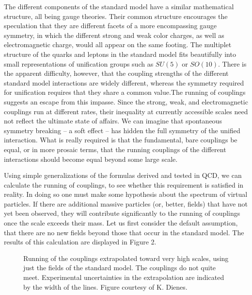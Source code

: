 \documentclass[aps,epsf]{revtex4}
\begin{document}
The different components of
the standard model have a similar mathematical structure, all being
gauge theories.  Their common structure encourages the speculation
that they are different facets of a more encompassing gauge symmetry,
in which the different strong and weak color charges, as well as
electromagnetic charge, would all appear on the same footing.  The
multiplet structure of the quarks and leptons in the standard model
fits beautifully into small representations of unification groups such
as $SU(5)$ or $SO(10)$.  There is the apparent difficulty, however,
that the coupling strengths of the different standard model
interactions are widely different, whereas the symmetry required for
unification requires that they share a common value.The running of
couplings suggests an escape from this impasse.  Since the strong,
weak, and electromagnetic couplings run at different rates, their
inequality at currently accessible scales need not reflect the
ultimate state of affairs.  We can imagine that spontaneous symmetry
breaking -- a soft effect -- has hidden the full symmetry of the
unified interaction.  What is really required is that the fundamental,
bare couplings be equal, or in more prosaic terms, that the running
couplings of the different interactions should become equal beyond
some large scale.  

Using simple generalizations of the formulas
derived and tested in QCD, we can calculate the running of couplings,
to see whether this requirement is satisfied in reality.  
In doing so one must make
some hypothesis about the spectrum of virtual particles.  If there are
additional massive particles (or, better, fields) that have not yet
been observed, they will contribute significantly to the running of
couplings once the scale exceeds their mass. Let us first consider the
default assumption, that there are no new fields beyond those that
occur in the standard model.  The results of this calculation are
displayed in Figure 2. 

\begin{figure}
\centerline{}
\caption{Running of the couplings
extrapolated toward very high scales, using just the fields of the
standard model.  The couplings do not quite meet.  Experimental
uncertainties in the extrapolation are indicated by the width of the
lines. Figure courtesy of K. Dienes.}
\label{fig2}
\end{figure}
\end{document}
